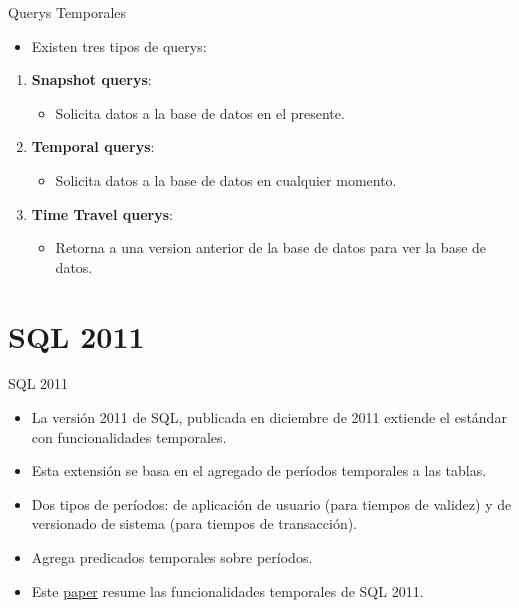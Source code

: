 \documentclass[handout, t, aspectratio=169]{beamer}
\begin{document}
\begin{frame}{Querys Temporales}
    \begin{itemize}
        \item Existen tres tipos de querys:
    \end{itemize}\pause
    \begin{enumerate}
        \item \textbf{Snapshot querys}:\pause
        \begin{itemize}
            \item Solicita datos a la base de datos en el presente.\pause
        \end{itemize}
        \item \textbf{Temporal querys}:\pause
        \begin{itemize}
            \item Solicita datos a la base de datos en cualquier momento.
        \end{itemize}\pause
        \item \textbf{Time Travel querys}:\pause
        \begin{itemize}
            \item Retorna a una version anterior de la base de datos para ver la base de datos.
        \end{itemize}
    \end{enumerate}
\end{frame}

\section{SQL 2011}

\begin{frame}{SQL 2011}
\begin{itemize}
    \item La versión 2011 de SQL, publicada en diciembre de 2011 extiende el estándar con funcionalidades temporales.\pause
    \item Esta extensión se basa en el agregado de períodos temporales a las tablas.\pause
    \item Dos tipos de períodos: de aplicación de usuario (para tiempos de validez) y de versionado de sistema (para tiempos de transacción).\pause
    \item Agrega predicados temporales sobre períodos.\pause
    \item Este \href{https://cs.ulb.ac.be/public/_media/teaching/infoh415/tempfeaturessql2011.pdf}{paper} resume las funcionalidades temporales de SQL 2011.
\end{itemize}
\end{frame}
\end{document}
